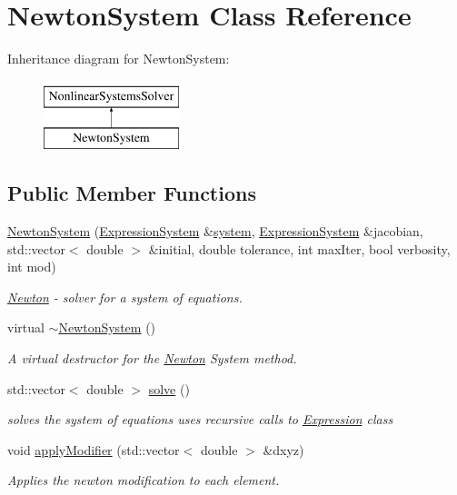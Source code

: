 \hypertarget{class_newton_system}{}\section{Newton\+System Class Reference}
\label{class_newton_system}
Inheritance diagram for Newton\+System\+:\begin{figure}[H]
\begin{center}
\leavevmode
\includegraphics[height=2.000000cm]{class_newton_system}
\end{center}
\end{figure}
\subsection*{Public Member Functions}
\begin{DoxyCompactItemize}
\item 
\hyperlink{class_newton_system_a0b9c529d0f7357b70bfb67edad9627e6}{Newton\+System} (\hyperlink{class_expression_system}{Expression\+System} \&\hyperlink{class_nonlinear_systems_solver_ad58bb6449941acd3f88bc5647b4c8068}{system}, \hyperlink{class_expression_system}{Expression\+System} \&jacobian, std\+::vector$<$ double $>$ \&initial, double tolerance, int max\+Iter, bool verbosity, int mod)
\begin{DoxyCompactList}\small\item\em \hyperlink{class_newton}{Newton} -\/ solver for a system of equations. \end{DoxyCompactList}\item 
virtual \hyperlink{class_newton_system_aef07a5a77f0a12fb18493239e38c816b}{$\sim$\+Newton\+System} ()\hypertarget{class_newton_system_aef07a5a77f0a12fb18493239e38c816b}{}\label{class_newton_system_aef07a5a77f0a12fb18493239e38c816b}

\begin{DoxyCompactList}\small\item\em A virtual destructor for the \hyperlink{class_newton}{Newton} System method. \end{DoxyCompactList}\item 
std\+::vector$<$ double $>$ \hyperlink{class_newton_system_ad75a80fbdf3598310c5e9497a7aad5d7}{solve} ()
\begin{DoxyCompactList}\small\item\em solves the system of equations uses recursive calls to \hyperlink{class_expression}{Expression} class \end{DoxyCompactList}\item 
void \hyperlink{class_newton_system_a06277d1bff35436d6ef260a9ecb4117c}{apply\+Modifier} (std\+::vector$<$ double $>$ \&dxyz)
\begin{DoxyCompactList}\small\item\em Applies the newton modification to each element. \end{DoxyCompactList}\end{DoxyCompactItemize}
